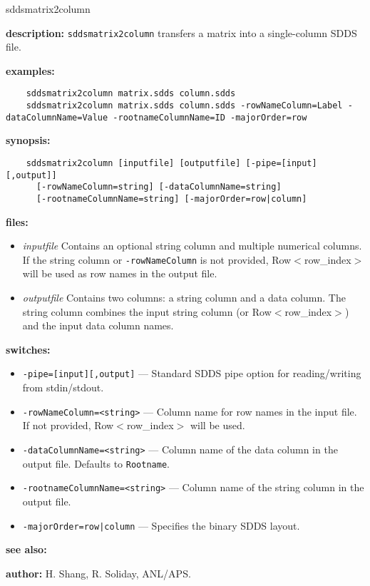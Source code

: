 \begin{sddsprog}{sddsmatrix2column}
  \item \textbf{description:} \verb|sddsmatrix2column| transfers a matrix into a single-column SDDS file.
  \item \textbf{examples:}
    \begin{verbatim}
    sddsmatrix2column matrix.sdds column.sdds
    sddsmatrix2column matrix.sdds column.sdds -rowNameColumn=Label -dataColumnName=Value -rootnameColumnName=ID -majorOrder=row
    \end{verbatim}
  \item \textbf{synopsis:}
    \begin{verbatim}
    sddsmatrix2column [inputfile] [outputfile] [-pipe=[input][,output]]
      [-rowNameColumn=string] [-dataColumnName=string]
      [-rootnameColumnName=string] [-majorOrder=row|column]
    \end{verbatim}
  \item \textbf{files:}
    \begin{itemize}
      \item {\em inputfile} Contains an optional string column and multiple numerical columns. If the string column or \verb|-rowNameColumn| is not provided, Row$<$row\_index$>$ will be used as row names in the output file.
      \item {\em outputfile} Contains two columns: a string column and a data column. The string column combines the input string column (or Row$<$row\_index$>$) and the input data column names.
    \end{itemize}
  \item \textbf{switches:}
    \begin{itemize}
      \item \verb|-pipe=[input][,output]| --- Standard SDDS pipe option for reading/writing from stdin/stdout.
      \item \verb|-rowNameColumn=<string>| --- Column name for row names in the input file. If not provided, Row$<$row\_index$>$ will be used.
      \item \verb|-dataColumnName=<string>| --- Column name of the data column in the output file. Defaults to \verb|Rootname|.
      \item \verb|-rootnameColumnName=<string>| --- Column name of the string column in the output file.
      \item \verb+-majorOrder=row|column+ --- Specifies the binary SDDS layout.
    \end{itemize}
  \item \textbf{see also:} 
  \item \textbf{author:} H. Shang, R. Soliday, ANL/APS.
\end{sddsprog}

